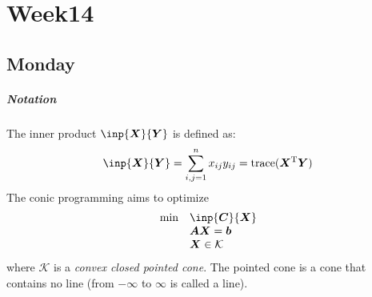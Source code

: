 \chapter{Week14}

\section{Monday}

\paragraph{Notation}The inner product $\inp{\bm X}{\bm Y}$ is defined as:
\[
\inp{\bm X}{\bm Y}=\sum_{i,j=1}^nx_{ij}y_{ij}=\mbox{trace}(\bm X\trans\bm Y)
\]
The conic programming aims to optimize
\begin{equation}
\begin{array}{ll}
\min&\inp{\bm C}{\bm X}\\
&\bm{AX}=\bm b\\
&\bm X\in\mathcal{K}
\end{array}
\end{equation}
where $\mathcal{K}$ is a \emph{convex closed pointed cone}. The pointed cone is a cone that contains no line (from $-\infty$ to $\infty$ is called a line).

